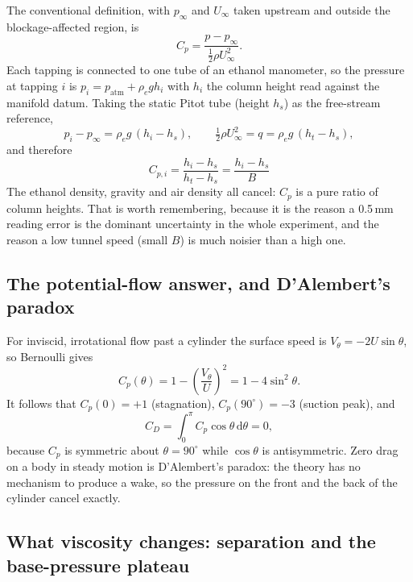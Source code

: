 \documentclass[11pt,a4paper]{article}
\newcommand{\Cp}{\ensuremath{C_p}}
\newcommand{\CD}{\ensuremath{C_D}}
\begin{document}
The conventional definition, with $p_\infty$ and $U_\infty$ taken upstream and outside the
blockage-affected region, is
\begin{equation}
\Cp = \frac{p - p_\infty}{\tfrac12 \rho U_\infty^2}.
\end{equation}
Each tapping is connected to one tube of an ethanol manometer, so the pressure at tapping $i$
is $p_i = p_{\text{atm}} + \rho_e g h_i$ with $h_i$ the column height read against the
manifold datum. Taking the static Pitot tube (height $h_s$) as the free-stream reference,
\begin{equation}
p_i - p_\infty = \rho_e g\,(h_i - h_s), \qquad
\tfrac12 \rho U_\infty^2 = q = \rho_e g\,(h_t - h_s),
\end{equation}
and therefore
\begin{equation}\label{eq:cp}
\boxed{\;\ensuremath{C_{p,i}} = \frac{h_i - h_s}{h_t - h_s} = \frac{h_i - h_s}{B}\;}
\end{equation}
The ethanol density, gravity and air density all cancel: \Cp{} is a pure ratio of column heights.
That is worth remembering, because it is the reason a 0.5\,mm reading error is the dominant
uncertainty in the whole experiment, and the reason a low tunnel speed (small $B$) is much
noisier than a high one.

\subsection{The potential-flow answer, and D'Alembert's paradox}

For inviscid, irrotational flow past a cylinder the surface speed is $V_\theta = -2U\sin\theta$,
so Bernoulli gives
\begin{equation}
\Cp(\theta) = 1 - \left(\frac{V_\theta}{U}\right)^2 = 1 - 4\sin^2\theta .
\end{equation}
It follows that $\Cp(0) = +1$ (stagnation), $\Cp(90^\circ) = -3$ (suction peak), and
\begin{equation}
\CD = \int_0^{\pi} \Cp\cos\theta\,\mathrm{d}\theta = 0 ,
\end{equation}
because $\Cp$ is symmetric about $\theta = 90^\circ$ while $\cos\theta$ is antisymmetric. Zero
drag on a body in steady motion is D'Alembert's paradox: the theory has no mechanism to
produce a wake, so the pressure on the front and the back of the cylinder cancel exactly.

\subsection{What viscosity changes: separation and the base-pressure plateau}
\end{document}
